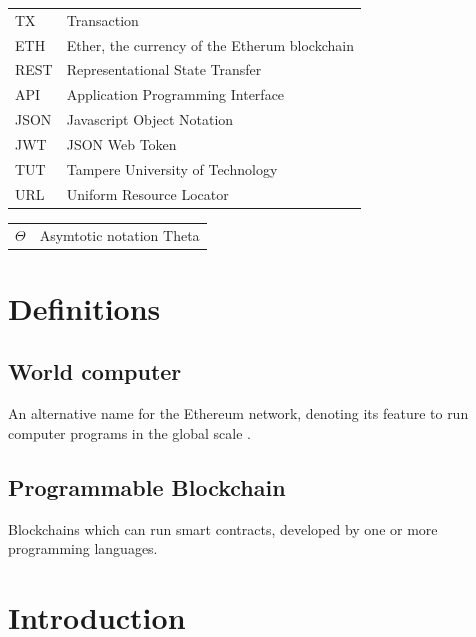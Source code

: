 \documentclass[twoside,numperchapter]{tutthesis} %
\begin{document}

\begin{tabular}[h]{@{} p{} p{} @{}}
TX & Transaction \\
ETH & Ether, the currency of the Etherum blockchain \\
REST & Representational State Transfer \\ 
API & Application Programming Interface \\
JSON & Javascript Object Notation \\
JWT & JSON Web Token \\
TUT & Tampere University of Technology \\
URL & Uniform Resource Locator 
\end{tabular}

\begin{tabular}[h]{@{} p{} p{} @{}}
$\Theta$ & Asymtotic notation Theta \\
\end{tabular}

\chapter*{Definitions}

\section*{World computer}

An alternative name for the Ethereum network, denoting its feature to run computer programs in the global scale \citep{EthereumWorldComputer}.

\section*{Programmable Blockchain}

Blockchains which can run smart contracts, developed by one or more programming languages.


\chapter{Introduction}
\label{ch:Introduction}
\end{document}
